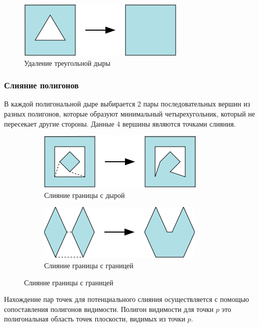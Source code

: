 \documentclass{fefu_thesis/cls/fefu}
\begin{document}
    \begin{figure}[H]
        \centering
        \includegraphics[scale=1]{images/remove_triangular_hole.png}
        \caption{Удаление треугольной дыры}
    \end{figure}

    \subsubsection{Слияние полигонов}

    В каждой полигональной дыре выбирается 2 пары последовательных вершин из разных полигонов, которые образуют минимальный четырехугольник, который не пересекает другие стороны. Данные 4 вершины являются точками слияния.

    \begin{figure}[H]
        \centering
        \begin{subfigure}[t]{\linewidth}
            \centering
            \includegraphics[scale=1]{images/polygonmerge.png}
            \caption{Слияние границы с дырой}
        \end{subfigure}
        \begin{subfigure}[t]{\linewidth}
            \centering
            \includegraphics[scale=1]{images/polygonmerge2.png}
            \caption{Слияние границы с границей}
        \end{subfigure}
    \end{figure}

    Нахождение пар точек для потенциального слияния осуществляется с помощью сопоставления полигонов видимости. Полигон видимости для точки $p$ это полигональная область точек плоскости, видимых из точки $p$.
\end{document}
